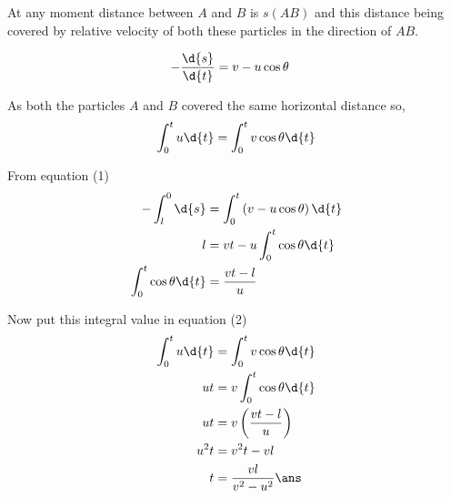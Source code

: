 \documentclass{article}
\begin{document}
At any moment distance between $A$ and $B$ is $s(AB)$ and this distance being covered by relative velocity of both these particles in the direction of $AB$. 

\begin{align}
-\dfrac{\d{s}}{\d{t}} &= v - u\cos\theta 
\end{align}

\pagebreak

As both the particles $A$ and $B$ covered the same horizontal distance so,
\begin{align}
\int_0^t u\d{t} = \int_0^t v\cos\theta\d{t}
\end{align}

From equation (1)
\begin{align*}
-\int_l^0 \d{s} &= \int_0^t \left( v -u\cos\theta \right) \d{t}\\
l &= vt - u\int_0^t \cos\theta \d{t}\\ 
\int_0^t \cos\theta \d{t} &= \dfrac{vt-l}{u}
\end{align*}

Now put this integral value in equation (2)
\begin{align*}
\int_0^t u\d{t} &= \int_0^t v\cos\theta\d{t}\\
ut &= v\int_0^t \cos\theta \d{t}\\
ut &= v \left(\dfrac{vt-l}{u}\right)\\
u^2t &= v^2t -vl \\
t &= \dfrac{vl}{v^2-u^2}\ans
\end{align*}

\pagebreak

\vspace*{\fill}
\begin{center}
	\fbox{\qrcode[height=2cm]{\gdrive}}
\end{center}
\vspace*{\fill}
\end{document}
